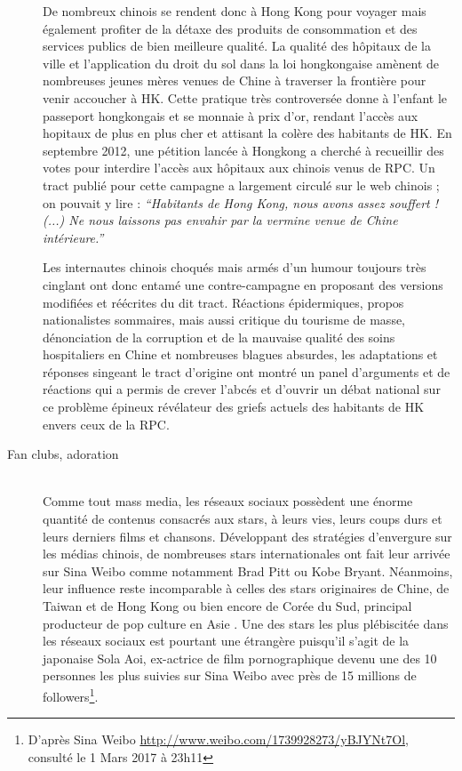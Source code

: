\begin{description}
De nombreux chinois se rendent donc à Hong Kong pour voyager mais également profiter de la détaxe des produits de consommation et des services publics de bien meilleure qualité. La qualité des hôpitaux de la ville et l{\textquoteright}application du droit du sol dans la loi hongkongaise amènent de nombreuses jeunes mères venues de Chine à traverser la frontière pour venir accoucher à HK. Cette pratique très controversée donne à l{\textquoteright}enfant le passeport hongkongais et se monnaie à prix d{\textquoteright}or, rendant l{\textquoteright}accès aux hopitaux de plus en plus cher et attisant la colère des habitants de HK. En septembre 2012, une pétition lancée à Hongkong a cherché à recueillir des votes pour interdire l{\textquoteright}accès aux hôpitaux aux chinois venus de RPC. Un tract publié pour cette campagne a largement circulé sur le web chinois ; on pouvait y lire :\textit{ {\textquotedblleft}Habitants de Hong Kong, nous avons assez souffert ! (...) Ne nous laissons pas envahir par la vermine venue de Chine intérieure.{\textquotedblright}}  

Les internautes chinois choqués mais armés d{\textquoteright}un humour toujours très cinglant ont donc entamé une contre-campagne en proposant des versions modifiées et réécrites du dit tract. Réactions épidermiques, propos nationalistes sommaires, mais aussi critique du tourisme de masse, dénonciation de la corruption et de la mauvaise qualité des soins hospitaliers en Chine et nombreuses blagues absurdes, les adaptations et réponses singeant le tract d{\textquoteright}origine ont montré un panel d{\textquoteright}arguments et de réactions qui a permis de crever l{\textquoteright}abcés et d{\textquoteright}ouvrir un débat national sur ce problème épineux révélateur des griefs actuels des habitants de HK envers ceux de la RPC.  


\item[Fan clubs, adoration]
\hfill \\
Comme tout mass media, les réseaux sociaux possèdent une énorme quantité de contenus consacrés aux stars, à leurs vies, leurs coups durs et leurs derniers films et chansons. Développant des stratégies d{\textquoteright}envergure sur les médias chinois, de nombreuses stars internationales ont fait leur arrivée sur Sina Weibo comme notamment Brad Pitt ou Kobe Bryant. Néanmoins, leur influence reste incomparable à celles des stars originaires de Chine, de Taiwan et de Hong Kong ou bien encore de Corée du Sud, principal producteur de pop culture en Asie \citep{Martel2010}. Une des stars les plus plébiscitée dans les réseaux sociaux est pourtant une étrangère puisqu{\textquoteright}il s{\textquoteright}agit de la japonaise Sola Aoi, ex-actrice de film pornographique devenu une des 10 personnes les plus suivies sur Sina Weibo avec près de 15 millions de followers\footnote{ D{\textquoteright}après Sina Weibo \url{http://www.weibo.com/1739928273/yBJYNt7Ol,} consulté le 1 Mars 2017 à 23h11}. 


\end{description}
